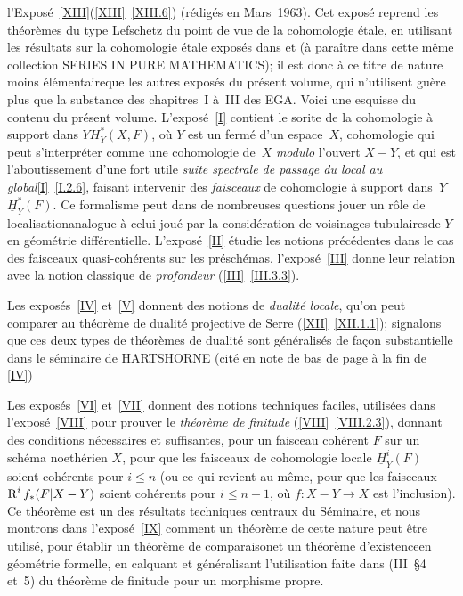 l'Expos\'e~\ref{XIII}\fg (\ref{XIII}~\ref{XIII.6}) (r\'edig\'es en Mars~1963). Cet expos\'e reprend les th\'eor\`emes du type Lefschetz du point de vue de la cohomologie \'etale, en utilisant les r\'esultats sur la cohomologie \'etale expos\'es dans  et  (\`a para\^itre dans cette m\^eme collection SERIES IN PURE MATHEMATICS); il est donc \`a ce titre de nature moins \og \'el\'ementaire\fg que les autres expos\'es du pr\'esent volume, qui n'utilisent gu\`ere plus que la substance des chapitres~I \`a~III des EGA. Voici une esquisse du contenu du pr\'esent volume. L'expos\'e~\ref{I} contient le sorite de la \og cohomologie \`a support dans $Y$\fg $H^*_Y(X, F)$, o\`u $Y$ est un ferm\'e d'un espace~$X$, cohomologie qui peut s'interpr\'eter comme une cohomologie de~$X$ \emph{modulo} l'ouvert $X-Y$, et qui est l'aboutissement d'une fort utile \og \emph{suite spectrale de passage du local au global}\fg \ref{I}~\ref{I.2.6}, faisant intervenir des \emph{faisceaux} de cohomologie \og \`a support dans~$Y$\fg $\underline{H}^*_Y(F)$. Ce formalisme peut dans de nombreuses questions jouer un r\^{o}le de \og localisation\fg analogue \`a celui jou\'e par la consid\'eration de voisinages \og tubulaires\fg de $Y$ en g\'eom\'etrie diff\'erentielle. L'expos\'e~\ref{II} \'etudie les notions pr\'ec\'edentes dans le cas des faisceaux quasi-coh\'erents sur les pr\'esch\'emas, l'expos\'e~\ref{III} donne leur relation avec la notion classique de \emph{profondeur} (\ref{III}~\ref{III.3.3}).

Les expos\'es~\ref{IV} et~\ref{V} donnent des notions de \emph{dualité locale}, qu'on peut comparer au th\'eor\`eme de dualit\'e projective de Serre (\ref{XII}~\ref{XII.1.1}); signalons que ces deux types de th\'eor\`emes de dualit\'e sont g\'en\'eralis\'es de fa\c con substantielle dans le s\'eminaire de HARTSHORNE (cit\'e en note de bas de page \`a la fin de \Exp \ref{IV})

Les expos\'es~\ref{VI} et~\ref{VII} donnent des notions techniques faciles, utilis\'ees dans l'expos\'e~\ref{VIII} pour prouver le \emph{théorème de finitude} (\ref{VIII}~\ref{VIII.2.3}), donnant des conditions n\'ecessaires et suffisantes, pour un faisceau coh\'erent $F$ sur un sch\'ema noeth\'erien $X$, pour que les faisceaux de cohomologie locale $\underline{H}^i_Y(F)$ soient coh\'erents pour $i\leq n$ (ou ce qui revient au m\^eme, pour que les faisceaux $\operatorname{R}^if_*(F|X-Y)$ soient coh\'erents pour $i\leq n-1$, o\`u $f\colon X-Y\to X$ est l'inclusion). Ce th\'eor\`eme est un des r\'esultats techniques centraux du S\'eminaire, et nous montrons dans l'expos\'e~\ref{IX} comment un th\'eor\`eme de cette nature peut \^etre utilis\'e, pour \'etablir un \og th\'eor\`eme de comparaison\fg et un \og th\'eor\`eme d'existence\fg en g\'eom\'etrie formelle, en calquant et g\'en\'eralisant l'utilisation faite dans (\EGA III~\oldS\S 4 et~5) du th\'eor\`eme de finitude pour un morphisme propre.


